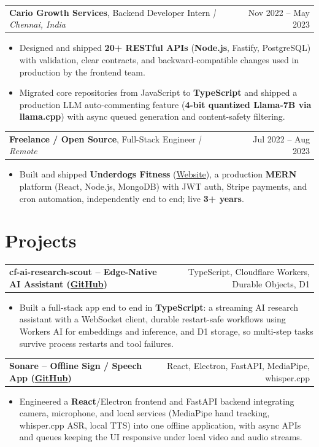\documentclass[letterpaper,11pt]{article}
\makeatletter
\newcommand{\expItem}[4]{%
  \vspace{3pt}
  \begin{tabular*}{\textwidth}{@{}l@{\extracolsep{\fill}}r@{}}
    \textbf{#1}, #2 \textit{| #3} & #4 \\
  \end{tabular*}\par\vspace{-2pt}
}
\newcommand{\projItem}[2]{%
  \vspace{6pt}
  \begin{tabular*}{\textwidth}{@{}l@{\extracolsep{\fill}}r@{}}
    \textbf{#1} & #2 \\
  \end{tabular*}\par\vspace{-2pt}
}
\makeatother
\begin{document}
\expItem{Cario Growth Services}{Backend Developer Intern}{Chennai, India}{Nov 2022 -- May 2023}
\begin{itemize}
  \item Designed and shipped \textbf{20+ RESTful APIs} (\textbf{Node.js}, Fastify, PostgreSQL) with validation, clear contracts, and backward-compatible changes used in production by the frontend team.
  \item Migrated core repositories from JavaScript to \textbf{TypeScript} and shipped a production LLM auto-commenting feature (\textbf{4-bit quantized Llama-7B via llama.cpp}) with async queued generation and content-safety filtering.
\end{itemize}

\expItem{Freelance / Open Source}{Full-Stack Engineer}{Remote}{Jul 2022 -- Aug 2023}
\begin{itemize}
  \item Built and shipped \textbf{Underdogs Fitness} (\href{https://www.underdogsfitness.in/}{Website}), a production \textbf{MERN} platform (React, Node.js, MongoDB) with JWT auth, Stripe payments, and cron automation, independently end to end; live \textbf{3+ years}.
\end{itemize}

\section{Projects}

\projItem{cf-ai-research-scout -- Edge-Native AI Assistant {\normalfont\small(\href{https://github.com/Deva-1903/cf_ai_research_scout}{GitHub})}}{TypeScript, Cloudflare Workers, Durable Objects, D1}
\begin{itemize}
  \item Built a full-stack app end to end in \textbf{TypeScript}: a streaming AI research assistant with a WebSocket client, durable restart-safe workflows using Workers AI for embeddings and inference, and D1 storage, so multi-step tasks survive process restarts and tool failures.
\end{itemize}

\projItem{Sonare -- Offline Sign / Speech App {\normalfont\small(\href{https://github.com/Deva-1903/Qualcomm-Sep25-Team-Sonare}{GitHub})}}{React, Electron, FastAPI, MediaPipe, whisper.cpp}
\begin{itemize}
  \item Engineered a \textbf{React}/Electron frontend and FastAPI backend integrating camera, microphone, and local services (MediaPipe hand tracking, whisper.cpp ASR, local TTS) into one offline application, with async APIs and queues keeping the UI responsive under local video and audio streams.
\end{itemize}
\end{document}

